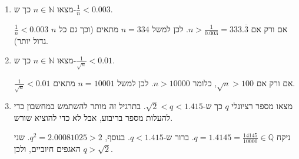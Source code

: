 \begin{enumerate}
\item
מצאו
$n\in\mathbb{N}$
כך ש-$\frac1n<0.003$.
\begin{solbox}
$\frac1n<0.003$
אם ורק אם
$n>\frac{1}{0.003}=333.\overline{3}$.
לכן למשל
$n=334$
מתאים (וכך גם כל $n$ גדול יותר).
\end{solbox}
\item
מצאו
$n\in\mathbb{N}$
כך ש-$\frac{1}{\sqrt n}<0.01$.
\begin{solbox}
$\frac{1}{\sqrt n}<0.01$
אם ורק אם
$\sqrt n>100$,
כלומר
$n>10000$.
לכן למשל
$n=10001$
מתאים.
\end{solbox}
\item
מצאו מספר רציונלי
$q$
כך ש-$\sqrt2<q<1.415$.
בתרגיל זה מותר להשתמש במחשבון כדי להעלות מספר בריבוע, אבל לא כדי להוציא שורש.
\begin{solbox}
ניקח
$q=1.4145=\frac{14145}{10000}\in\mathbb{Q}$.
ברור ש-$q<1.415$.
בנוסף,
$q^2=2.00081025>2$.
שני האגפים חיוביים, ולכן
$q>\sqrt2$.
\end{solbox}
\end{enumerate}

